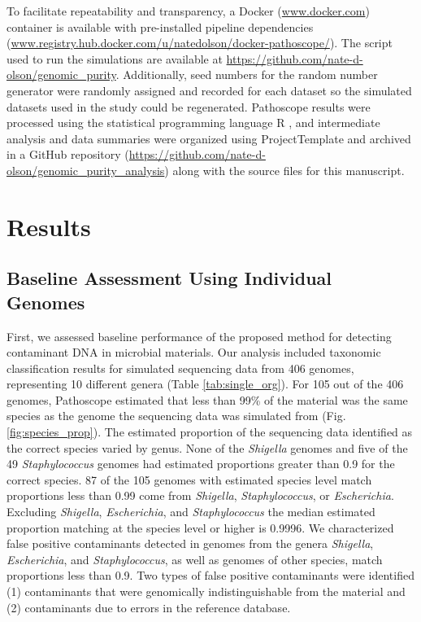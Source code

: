 \documentclass[fleqn,10pt,lineno]{wlpeerj}\usepackage[]{graphicx}\usepackage[]{color}
\begin{document}

To facilitate repeatability and transparency, a Docker (\url{www.docker.com}) container is available 
with pre-installed pipeline dependencies (\url{www.registry.hub.docker.com/u/natedolson/docker-pathoscope/}). 
The script used to run the simulations are available at \url{https://github.com/nate-d-olson/genomic_purity}.
Additionally, seed numbers for the random number generator were randomly assigned and recorded for each dataset so the simulated datasets used in the study could be regenerated.
Pathoscope results were processed using the statistical programming language R \citep{R}, and intermediate analysis and data summaries were organized using ProjectTemplate \citep{ProjectTemplate} and archived in a GitHub repository (\url{https://github.com/nate-d-olson/genomic_purity_analysis}) along with the source files for this manuscript.

\section*{Results}

\subsection*{Baseline Assessment Using Individual Genomes}

First, we assessed baseline performance of the proposed method for detecting contaminant DNA in microbial materials. 
Our analysis included taxonomic classification results for simulated sequencing data  from 406 genomes, representing 10 different genera (Table \ref{tab:single_org}). 
For 105 out of the 406 genomes, Pathoscope estimated that less than 99\% of the material was the same species as the genome the sequencing data was simulated from (Fig. \ref{fig:species_prop}). 
The estimated proportion of the sequencing data identified as the correct species varied by genus. 
None of the \textit{Shigella} genomes and five of the 49 \textit{Staphylococcus} genomes had estimated proportions greater than 0.9 for the correct species. 
87 of the 105 genomes with estimated species level match proportions less than 0.99 come from \textit{Shigella}, \textit{Staphylococcus}, or \textit{Escherichia}. 
Excluding \textit{Shigella}, \textit{Escherichia}, and \textit{Staphylococcus} the median estimated proportion matching at the species level or higher is  0.9996. 
We characterized false positive contaminants detected in genomes from the genera \textit{Shigella}, \textit{Escherichia}, and \textit{Staphylococcus}, as well as genomes of other species, match proportions less than 0.9. 
Two types of false positive contaminants were identified (1) contaminants that were genomically indistinguishable from the material and (2) contaminants due to errors in the reference database.
\end{document}
